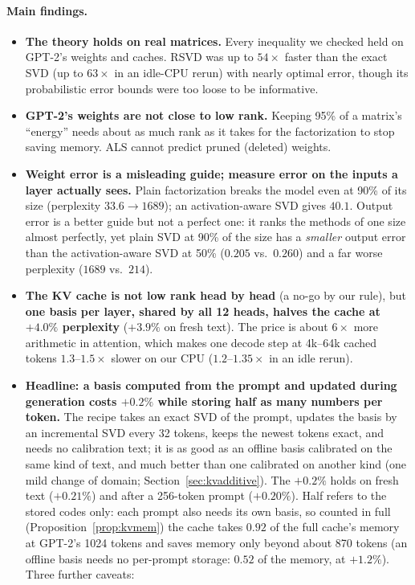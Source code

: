 \documentclass[10pt]{article}
\theoremstyle{plain}
\theoremstyle{definition}
\theoremstyle{remark}
\begin{document}
\paragraph{Main findings.}
\begin{itemize}[leftmargin=2em,itemsep=1pt]
\item \textbf{The theory holds on real matrices.} Every inequality we checked held on GPT-2's weights and caches. RSVD was up to $54\times$ faster than the exact SVD (up to $63\times$ in an idle-CPU rerun) with nearly optimal error, though its probabilistic error bounds were too loose to be informative.
\item \textbf{GPT-2's weights are not close to low rank.} Keeping 95\% of a matrix's ``energy'' needs about as much rank as it takes for the factorization to stop saving memory. ALS cannot predict pruned (deleted) weights.
\item \textbf{Weight error is a misleading guide; measure error on the inputs a layer actually sees.} Plain factorization breaks the model even at 90\% of its size (perplexity $33.6\to1689$); an activation-aware SVD gives $40.1$. Output error is a better guide but not a perfect one: it ranks the methods of one size almost perfectly, yet plain SVD at 90\% of the size has a \emph{smaller} output error than the activation-aware SVD at 50\% ($0.205$ vs.\ $0.260$) and a far worse perplexity ($1689$ vs.\ $214$).
\item \textbf{The KV cache is not low rank head by head} (a no-go by our rule), but \textbf{one basis per layer, shared by all 12 heads, halves the cache at $+4.0\%$ perplexity} ($+3.9\%$ on fresh text). The price is about $6\times$ more arithmetic in attention, which makes one decode step at 4k--64k cached tokens $1.3$--$1.5\times$ slower on our CPU ($1.2$--$1.35\times$ in an idle rerun).
\item \textbf{Headline: a basis computed from the prompt and updated during generation costs $+0.2\%$ while storing half as many numbers per token.} The recipe takes an exact SVD of the prompt, updates the basis by an incremental SVD every 32 tokens, keeps the newest tokens exact, and needs no calibration text; it is as good as an offline basis calibrated on the same kind of text, and much better than one calibrated on another kind (one mild change of domain; Section~\ref{sec:kvadditive}). The $+0.2\%$ holds on fresh text ($+0.21\%$) and after a 256-token prompt ($+0.20\%$). Half refers to the stored codes only: each prompt also needs its own basis, so counted in full (Proposition~\ref{prop:kvmem}) the cache takes $0.92$ of the full cache's memory at GPT-2's 1024 tokens and saves memory only beyond about 870 tokens (an offline basis needs no per-prompt storage: $0.52$ of the memory, at $+1.2\%$). Three further caveats:

\end{itemize}
\end{document}
